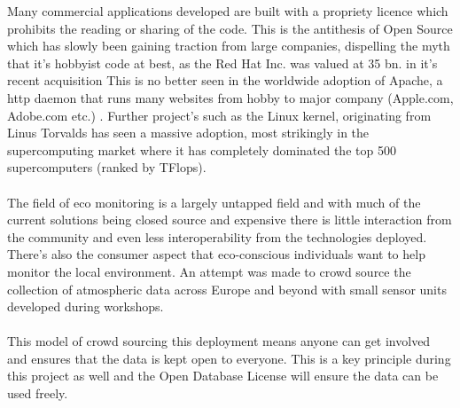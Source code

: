 Many commercial applications developed are built with a propriety licence which prohibits the reading or sharing of the code. This is the antithesis of Open Source which has slowly been gaining traction from large companies, dispelling the myth that it's hobbyist code at best, as the Red Hat Inc. was valued at 35 bn. in it's recent acquisition \citep{Hammond2018} This is no better seen in the worldwide adoption of Apache, a http daemon that runs many websites from hobby to major company (Apple.com, Adobe.com etc.) \citep{W3techs2018}. Further project's such as the Linux kernel, originating from Linus Torvalds has seen a massive adoption, most strikingly in the supercomputing market where it has completely dominated the top 500 supercomputers (ranked by TFlops). \citep{Top5002018}
\\\\
The field of eco monitoring is a largely untapped field and with much of the current solutions being closed source and expensive \citep{TheIoTMarketplace2015} there is little interaction from the community and even less interoperability from the technologies deployed. There's also the consumer aspect that eco-conscious individuals want to help monitor the local environment. An attempt was made to crowd source the collection of atmospheric data \citep{OKLabStuttgart2018} across Europe and beyond with small sensor units developed during workshops.
\\\\
This model of crowd sourcing this deployment means anyone can get involved and ensures that the data is kept open to everyone. This is a key principle during this project as well and the Open Database License \citep{OpenDataCommons2011} will ensure the data can be used freely.